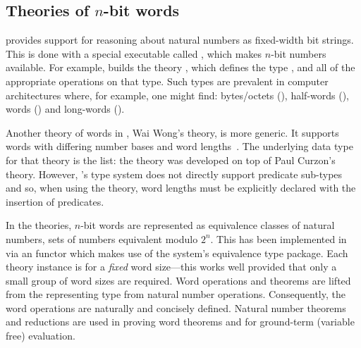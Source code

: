 \subsection{Theories of $n$-bit words}

{
\newcommand{\bitwise}{\ensuremath\mathtt{bitwise}}
\newcommand{\slice}{\ensuremath\mathtt{slice}}
\newcommand{\bits}{\ensuremath\mathtt{bits}}
\newcommand{\minn}{\ensuremath\mathtt{min}}
\newcommand{\bit}{\ensuremath\mathtt{bit}}
\newcommand{\suc}{\ensuremath\mathtt{suc}}
\newlength{\entrysize}
\newcommand{\cdotfill}{\hspace*{\fill}\ensuremath{\cdots}\hspace*{\fill}}


\HOL{} provides support for reasoning about natural numbers as
fixed-width bit strings.  This is done with a special executable
called , which makes $n$-bit numbers available.  For
example,  builds the theory ,
which defines the type , and all of the appropriate
operations on that type.  Such types are prevalent in computer
architectures where, for example, one might find: bytes/octets
(), half-words (), words () and
long-words ().

Another theory of words in \HOL{}, Wai Wong's  theory,
is more generic.  It supports words with differing number bases and
word lengths~\cite{wong}.  The underlying data type for that theory is
the list: the theory was developed on top of Paul Curzon's
 theory.  However, \HOL's type system does not directly
support predicate sub-types and so, when using the theory, word
lengths must be explicitly declared with the insertion of predicates.

In the  theories, $n$-bit words are
represented as equivalence classes of natural numbers, \ie{} sets of
numbers equivalent modulo $2^n$.  This has been implemented in \HOL{}
via an \ML{} functor which makes use of the system's equivalence type
package.  Each theory instance is for a \emph{fixed} word size---this
works well provided that only a small group of word sizes are
required.  Word operations and theorems are lifted from the
representing type \ie{} from natural number operations.  Consequently,
the word operations are naturally and concisely defined.  Natural
number theorems and reductions are used in proving word theorems and
for ground-term (variable free) evaluation.

}
